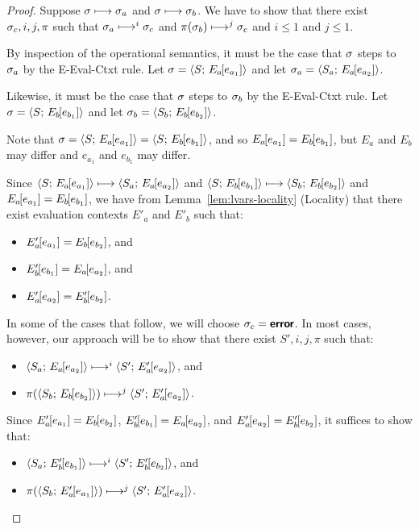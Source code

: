 \begin{proof}
  Suppose $\sigma \longmapsto \sigma_a$ and $\sigma \longmapsto \sigma_b$.
  We have to show that there exist $\sigma_c, i, j, \pi$ such that
  $\sigma_a \longmapsto^i \sigma_c$ and $\pi(\sigma_b) \longmapsto^j
  \sigma_c$ and $i \leq 1$ and $j \leq 1$.

  By inspection of the operational semantics, it must be the case that
  $\sigma$ steps to $\sigma_a$ by the {\sc E-Eval-Ctxt} rule.  Let
  $\sigma = \langle S;\, E_a\hspace{-1mm}\left[e_{a_1}\right] \rangle$ and let $\sigma_a =
  \langle S_a;\, E_a\hspace{-1mm}\left[e_{a_2}\right] \rangle$.

  Likewise, it must be the case that $\sigma$ steps to $\sigma_b$ by the
  {\sc E-Eval-Ctxt} rule.  Let $\sigma =
  \langle S;\, E_b\hspace{-1mm}\left[e_{b_1}\right] \rangle$ and let $\sigma_b =
  \langle S_b;\, E_b\hspace{-1mm}\left[e_{b_2}\right] \rangle$.

  Note that $\sigma = \langle S;\, E_a\hspace{-1mm}\left[e_{a_1}\right] \rangle =
  \langle S;\, E_b\hspace{-1mm}\left[e_{b_1}\right] \rangle$, and so
  $E_a\hspace{-1mm}\left[e_{a_1}\right] = E_b\hspace{-1mm}\left[e_{b_1}\right]$, but $E_a$ and
  $E_b$ may differ and $e_{a_1}$ and $e_{b_1}$ may differ.

  Since $\langle S;\, E_a\hspace{-1mm}\left[e_{a_1}\right] \rangle \longmapsto
  \langle S_a;\, E_a\hspace{-1mm}\left[e_{a_2}\right] \rangle$ and
  $\langle S;\, E_b\hspace{-1mm}\left[e_{b_1}\right] \rangle \longmapsto
  \langle S_b;\, E_b\hspace{-1mm}\left[e_{b_2}\right] \rangle$ and $E_a\hspace{-1mm}\left[e_{a_1}\right]
  = E_b\hspace{-1mm}\left[e_{b_1}\right]$, we have from
  Lemma~\ref{lem:lvars-locality} (Locality) that there exist
  evaluation contexts $E'_a$ and $E'_b$ such that:

  \begin{itemize}
  \item $E'_a\hspace{-1mm}\left[e_{a_1}\right] = E_b\hspace{-1mm}\left[e_{b_2}\right]$, and
  \item $E'_b\hspace{-1mm}\left[e_{b_1}\right] = E_a\hspace{-1mm}\left[e_{a_2}\right]$, and
  \item $E'_a\hspace{-1mm}\left[e_{a_2}\right] =
  E'_b\hspace{-1mm}\left[e_{b_2}\right]$.
  \end{itemize}

  In some of the cases that follow, we will choose $\sigma_c = \textbf{\textsf{error}}$.
  In most cases, however, our approach will be to show that there
  exist $S', i, j, \pi$ such that:
  \begin{itemize}
  \item $\langle S_a;\, E_a\hspace{-1mm}\left[e_{a_2}\right] \rangle \longmapsto^i
    \langle S';\, E'_a\hspace{-1mm}\left[e_{a_2}\right] \rangle$, and
  \item $\pi(\langle S_b;\, E_b\hspace{-1mm}\left[e_{b_2}\right] \rangle) \longmapsto^j
    \langle S';\, E'_a\hspace{-1mm}\left[e_{a_2}\right] \rangle$.
  \end{itemize}
  Since $E'_a\hspace{-1mm}\left[e_{a_1}\right] = E_b\hspace{-1mm}\left[e_{b_2}\right]$,
  $E'_b\hspace{-1mm}\left[e_{b_1}\right] = E_a\hspace{-1mm}\left[e_{a_2}\right]$, and
  $E'_a\hspace{-1mm}\left[e_{a_2}\right] = E'_b\hspace{-1mm}\left[e_{b_2}\right]$, it suffices
  to show that:
  \begin{itemize}
  \item $\langle S_a;\, E'_b\hspace{-1mm}\left[e_{b_1}\right] \rangle \longmapsto^i
    \langle S';\, E'_b\hspace{-1mm}\left[e_{b_2}\right] \rangle$, and
  \item $\pi(\langle S_b;\, E'_a\hspace{-1mm}\left[e_{a_1}\right] \rangle) \longmapsto^j
    \langle S';\, E'_a\hspace{-1mm}\left[e_{a_2}\right] \rangle$.
  \end{itemize}


\end{proof}
